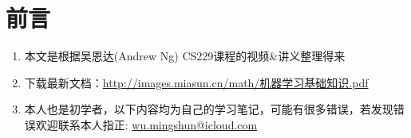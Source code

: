 \section{前言}
\begin{enumerate}
	\item 本文是根据吴恩达(Andrew Ng) CS229课程的视频\&讲义整理得来
	\item 下载最新文档：\href{http://images.miasun.cn/math/机器学习基础知识.pdf}{http://images.miasun.cn/math/机器学习基础知识.pdf}
	\item 本人也是初学者，以下内容均为自己的学习笔记，可能有很多错误，若发现错误欢迎联系本人指正: \href{mailto:wu.mingshun@icloud.com}{wu.mingshun@icloud.com}
	
\end{enumerate}



























